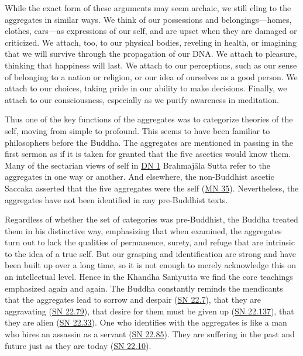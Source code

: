 \documentclass[12pt,openany]{book}%
\begin{document}
While the exact form of these arguments may seem archaic, we still cling to the aggregates in similar ways. We think of our possessions and belongings—homes, clothes, cars—as expressions of our self, and are upset when they are damaged or criticized. We attach, too, to our physical bodies, reveling in health, or imagining that we will survive through the propagation of our DNA. We attach to pleasure, thinking that happiness will last. We attach to our perceptions, such as our sense of belonging to a nation or religion, or our idea of ourselves as a good person. We attach to our choices, taking pride in our ability to make decisions. Finally, we attach to our consciousness, especially as we purify awareness in meditation.

Thus one of the key functions of the aggregates was to categorize theories of the self, moving from simple to profound. This seems to have been familiar to philosophers before the Buddha. The aggregates are mentioned in passing in the first sermon as if it is taken for granted that the five ascetics would know them. Many of the sectarian views of self in \href{https://suttacentral.net/dn1}{DN 1} \textsanskrit{Brahmajāla} Sutta refer to the aggregates in one way or another. And elsewhere, the non-Buddhist ascetic Saccaka asserted that the five aggregates were the self (\href{https://suttacentral.net/mn35}{MN 35}). Nevertheless, the aggregates have not been identified in any pre-Buddhist texts.

Regardless of whether the set of categories was pre-Buddhist, the Buddha treated them in his distinctive way, emphasizing that when examined, the aggregates turn out to lack the qualities of permanence, surety, and refuge that are intrinsic to the idea of a true self. But our grasping and identification are strong and have been built up over a long time, so it is not enough to merely acknowledge this on an intellectual level. Hence in the Khandha \textsanskrit{Saṁyutta} we find the core teachings emphasized again and again. The Buddha constantly reminds the mendicants that the aggregates lead to sorrow and despair (\href{https://suttacentral.net/sn22.7}{SN 22.7}), that they are aggravating (\href{https://suttacentral.net/sn22.79}{SN 22.79}), that desire for them must be given up (\href{https://suttacentral.net/sn22.137}{SN 22.137}), that they are alien (\href{https://suttacentral.net/sn22.33}{SN 22.33}). One who identifies with the aggregates is like a man who hires an assassin as a servant (\href{https://suttacentral.net/sn22.85}{SN 22.85}). They are suffering in the past and future just as they are today (\href{https://suttacentral.net/sn22.10}{SN 22.10}).
\end{document}
